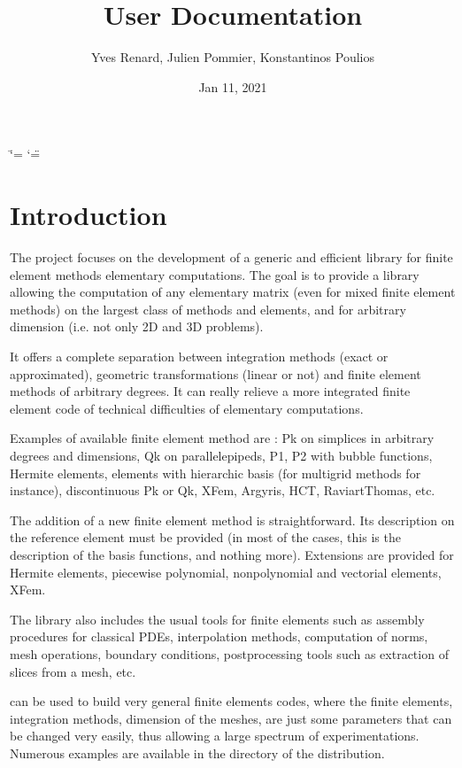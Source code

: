 \documentclass[a4paper,11pt,english]{sphinxmanual}
\title{User Documentation}
\date{Jan 11, 2021}
\author{Yves Renard, Julien Pommier, Konstantinos Poulios}
\begin{document}
\ifdefined\shorthandoff
  \ifnum\catcode`\=\string=\active\shorthandoff{=}\fi
  \ifnum\catcode`\"=\active{}\fi
\fi

\pagestyle{empty}
\sphinxmaketitle
\pagestyle{plain}
\sphinxtableofcontents
\pagestyle{normal}
\label{\detokenize{userdoc/index::doc}}



\chapter{Introduction}
\label{\detokenize{userdoc/intro:introduction}}\label{\detokenize{userdoc/intro:ud-intro}}\label{\detokenize{userdoc/intro::doc}}
The  project focuses on the development of a generic and
efficient  library for finite element methods elementary
computations. The goal is to provide a library allowing the
computation of any elementary matrix (even for mixed finite element
methods) on the largest class of methods and elements, and for
arbitrary dimension (i.e. not only 2D and 3D problems).

It offers a complete separation between integration methods (exact or
approximated), geometric transformations (linear or not) and finite
element methods of arbitrary degrees. It can really relieve a more
integrated finite element code of technical difficulties of
elementary computations.

Examples of available finite element method are : Pk on simplices in
arbitrary degrees and dimensions, Qk on parallelepipeds, P1, P2 with
bubble functions, Hermite elements, elements with hierarchic basis
(for multigrid methods for instance), discontinuous Pk or Qk, XFem,
Argyris, HCT, Raviart\sphinxhyphen{}Thomas, etc.

The addition of a new finite element method is straightforward. Its
description on the reference element must be provided (in most of the
cases, this is the description of the basis functions, and nothing
more). Extensions are provided for Hermite elements, piecewise
polynomial, non\sphinxhyphen{}polynomial and vectorial elements, XFem.

The library also includes the usual tools for finite elements such as
assembly procedures for classical PDEs, interpolation methods,
computation of norms, mesh operations, boundary conditions,
post\sphinxhyphen{}processing tools such as extraction of slices from a mesh, etc.

 can be used to build very general finite elements codes, where
the finite elements, integration methods, dimension of the meshes,
are just some parameters that can be changed very easily, thus
allowing a large spectrum of experimentations. Numerous examples are
available in the  directory of the distribution.
\end{document}
